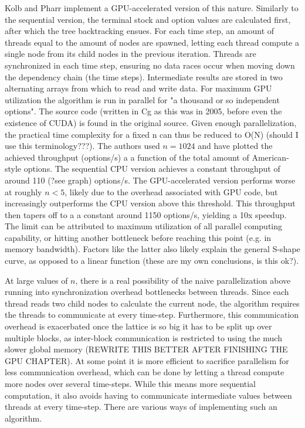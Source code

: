 \documentclass[english,12pt,a4paper,pdftex,sci,utf8]{aaltothesis}
\begin{document}
Kolb and Pharr \cite{pharr2005gpu} implement a GPU-accelerated version of this nature. Similarly to the sequential version, the terminal stock and option values are calculated first, after which the tree backtracking ensues. For each time step, an amount of threads equal to the amount of nodes are spawned, letting each thread compute a single node from its child nodes in the previous iteration. Threads are synchronized in each time step, ensuring no data races occur when moving down the dependency chain (the time steps). Intermediate results are stored in two alternating arrays from which to read and write data. For maximum GPU utilization the algorithm is run in parallel for "a thousand or so independent options". The source code (written in Cg as this was in 2005, before even the existence of CUDA) is found in the original source. Given enough parallelization, the practical time complexity for a fixed n can thus be reduced to O(N) (should I use this terminology???). The authors used $n=1024$ and have plotted the achieved throughput (options/s) a a function of the total amount of American-style options. The sequential CPU version achieves a constant throughput of around 110 (?see graph) options/s. The GPU-accelerated version performs worse at roughly $n < 5$, likely due to the overhead associated with GPU code, but increasingly outperforms the CPU version above this threshold. This throughput then tapers off to a a constant around 1150 options/s, yielding a 10x speedup. The limit can be attributed to maximum utilization of all parallel computing capability, or hitting another bottleneck before reaching this point (e.g. in memory bandwidth). Factors like the latter also likely explain the general S-shape curve, as opposed to a linear function (these are my own conclusions, is this ok?).

At large values of $n$, there is a real possibility of the naive parallelization above running into synchronization overhead bottlenecks between threads. Since each thread reads two child nodes to calculate the current node, the algorithm requires the threads to communicate at every time-step. Furthermore, this communication overhead is exacerbated once the lattice is so big it has to be split up over multiple blocks, as inter-block communication is restricted to using the much slower global memory (REWRITE THIS BETTER AFTER FINISHING THE GPU CHAPTER). At some point it is more efficient to sacrifice parallelism for less communication overhead, which can be done by letting a thread compute more nodes over several time-steps. While this means more sequential computation, it also avoids having to communicate intermediate values between threads at every time-step. There are various ways of implementing such an algorithm. \cite{suo2015gpu}
\end{document}
